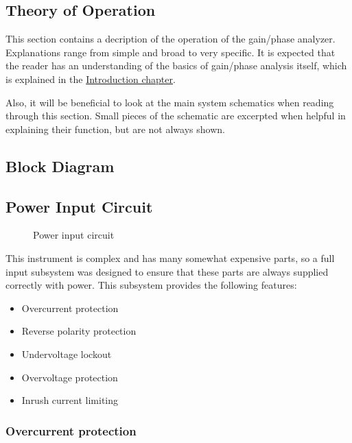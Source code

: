 \documentclass[article]{memoir}
\begin{document}
\begin{multicols}{2}

\chapter{Theory of Operation}

This section contains a decription of the operation of the gain/phase analyzer.
Explanations range from simple and broad to very specific.
It is expected that the reader has an understanding of the basics of
gain/phase analysis itself, which is explained in the \hyperref[chap:intro]{Introduction
chapter}.

Also, it will be beneficial to look at the main system schematics when reading
through this section. Small pieces of the schematic are excerpted when helpful
in explaining their function, but are not always shown.

\section{Block Diagram}

\section{Power Input Circuit}

\begin{figure}[H]
\centering
{}
\caption{Power input circuit}
\label{fig:powerinput}
\end{figure}

This instrument is complex and has many somewhat expensive parts, so a full
input subsystem was designed to ensure that these parts are always supplied
correctly with power. This subsystem provides the following features:

\begin{itemize}
\item{Overcurrent protection}
\item{Reverse polarity protection}
\item{Undervoltage lockout}
\item{Overvoltage protection}
\item{Inrush current limiting}
\end{itemize}

\subsection{Overcurrent protection}


\end{multicols}
\end{document}
